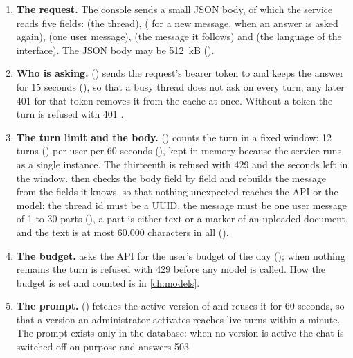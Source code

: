 \begin{enumerate}
  \item \textbf{The request.} The console sends
    a small JSON body, of which the service reads five fields:  (the thread),
     ( for a new message,  when
    an answer is asked again),  (one user message),  (the message
    it follows) and  (the language of the interface). The JSON body may be 512~kB ().
  \item \textbf{Who is asking.}  () sends the
    request's bearer token to  and keeps the answer for 15 seconds
    (), so that a busy thread does not ask on every turn; any later 401
    for that token removes it from the cache at once. Without a token the turn is refused with
    401 .
  \item \textbf{The turn limit and the body.}  ()
    counts the turn in a fixed window: 12 turns () per user per 60
    seconds (), kept in memory because the service runs as a single
    instance. The thirteenth is refused with 429  and the seconds left in the
    window.  then checks the body field by field and rebuilds the message
    from the fields it knows, so that nothing unexpected reaches the API or the model: the
    thread id must be a UUID, the message must be one user message of 1 to 30 parts
    (), a part is either text or a marker of an uploaded document, and the text
    is at most 60,000 characters in all ().
  \item \textbf{The budget.}  asks the API for the user's budget of the day
    (); when nothing remains the turn is refused with 429
     before any model is called. How the budget is set and counted is in
    \cref{ch:models}.
  \item \textbf{The prompt.}  () fetches the active
    version of  and reuses it for 60 seconds, so that a version an
    administrator activates reaches live turns within a minute. The prompt exists only in the
    database: when no version is active the chat is switched off on purpose and answers 503

\end{enumerate}

